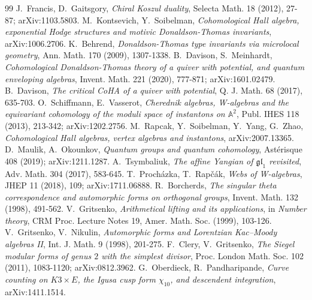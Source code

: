 \begin{thebibliography}{99}
 J.~Francis, D.~Gaitsgory, \emph{Chiral Koszul duality},
Selecta Math. 18 (2012), 27-87; arXiv:1103.5803.
 M.~Kontsevich, Y.~Soibelman, \emph{Cohomological Hall
algebra, exponential Hodge structures and motivic Donaldson-Thomas invariants},
arXiv:1006.2706.
 K.~Behrend, \emph{Donaldson-Thomas type invariants via
microlocal geometry}, Ann. Math. 170 (2009), 1307-1338.
 B.~Davison, S.~Meinhardt, \emph{Cohomological
Donaldson-Thomas theory of a quiver with potential, and quantum enveloping
algebras}, Invent. Math. 221 (2020), 777-871; arXiv:1601.02479.
 B.~Davison, \emph{The critical CoHA of a quiver with
potential}, Q. J. Math. 68 (2017), 635-703.
 O.~Schiffmann, E.~Vasserot, \emph{Cherednik algebras,
W-algebras and the equivariant cohomology of the moduli space of instantons on
$\mathbb{A}^{2}$}, Publ. IHES 118 (2013), 213-342; arXiv:1202.2756.
 M.~Rapcak, Y.~Soibelman, Y.~Yang, G.~Zhao, \emph{Cohomological
Hall algebras, vertex algebras and instantons}, arXiv:2007.13365.
 D.~Maulik, A.~Okounkov, \emph{Quantum groups and quantum
cohomology}, Ast\'{e}risque 408 (2019); arXiv:1211.1287.
 A.~Tsymbaliuk, \emph{The affine Yangian of
$\mathfrak{gl}_{1}$ revisited}, Adv. Math. 304 (2017), 583-645.
 T.~Proch\'azka, T.~Rap\v{c}\'ak, \emph{Webs of W-algebras},
JHEP 11 (2018), 109; arXiv:1711.06888.
 R.~Borcherds, \emph{The singular theta correspondence
and automorphic forms on orthogonal groups}, Invent. Math. 132 (1998),
491-562.
 V.~Gritsenko, \emph{Arithmetical lifting and its
applications}, in \emph{Number theory}, CRM Proc. Lecture Notes 19,
Amer. Math. Soc. (1999), 103-126.
 V.~Gritsenko, V.~Nikulin, \emph{Automorphic forms and
Lorentzian Kac--Moody algebras II}, Int. J. Math. 9 (1998), 201-275.
 F.~Clery, V.~Gritsenko, \emph{The Siegel
modular forms of genus $2$ with the simplest divisor}, Proc. London Math.
Soc. 102 (2011), 1083-1120; arXiv:0812.3962.
 G.~Oberdieck, R.~Pandharipande, \emph{Curve counting on
$K3\times E$, the Igusa cusp form $\chi_{10}$, and descendent integration},
arXiv:1411.1514.
\end{thebibliography}
